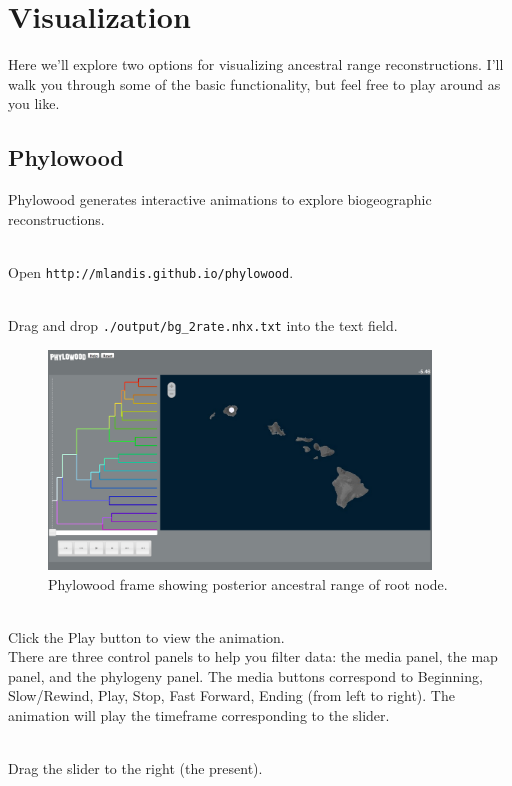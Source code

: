 \section{Visualization}

Here we'll explore two options for visualizing ancestral range reconstructions.
I'll walk you through some of the basic functionality, but feel free to play around as you like.

\subsection{Phylowood}

Phylowood generates interactive animations to explore biogeographic reconstructions.

\noindent \\ \impmark Open \texttt{http://mlandis.github.io/phylowood}.

\noindent \\ \impmark Drag and drop \texttt{./output/bg\_2rate.nhx.txt} into the text field.

\begin{figure}[H]
\centering
\includegraphics[width=4in]{figures/phw_mrca}
\caption{Phylowood frame showing posterior ancestral range of root node.}
\end{figure}

\noindent \\ \impmark Click the Play button to view the animation. \\

There are three control panels to help you filter data: the media panel, the map panel, and the phylogeny panel.
The media buttons correspond to Beginning, Slow/Rewind, Play, Stop, Fast Forward, Ending (from left to right).
The animation will play the timeframe corresponding to the slider.

\noindent \\ \impmark Drag the slider to the right (the present).

